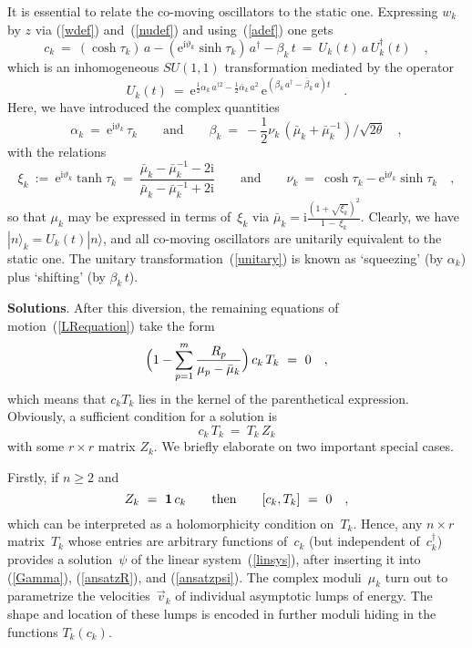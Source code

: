 \documentclass[a4paper,11pt]{article}
\numberwithin{equation}{section}
\def\a{\alpha}
\def\b{\beta}
\def\th{\theta}
\def\e{\mbox{e}}
\def\i{\mbox{i}}
\def\sfrac#1#2{{\textstyle\frac{#1}{#2}}}
\newcommand{\adag}{a^{\dagger}}
\begin{document}
It is essential to relate the co-moving oscillators to the static one.
Expressing $w_k$ by $z$ via (\ref{wdef}) and~(\ref{nudef})
and using~(\ref{adef}) one gets
\begin{equation} \label{unitary}
c_k\ =\ (\cosh\tau_k)\,a - (\e^{\i\vartheta_k}\sinh\tau_k)\,\adag
- \b_k\,t\ =\ U_k(t)\,a\,U_k^\dagger(t) \quad,
\end{equation}
which is an inhomogeneous $SU(1,1)$ transformation mediated by the operator
\cite{perel}
\begin{equation} \label{Udef}
U_k(t)\ =\ \e^{\frac12\a_k\,a^{\dagger 2} -\frac12\bar\a_k\,a^2}\,
\e^{(\b_k\,\adag-\bar\b_k\,a)t} \quad.
\end{equation}
Here, we have introduced the complex quantities
\begin{equation}
\a_k\ =\ \e^{\i\vartheta_k}\,\tau_k
\qquad\textrm{and}\qquad
\b_k\ =\ -\sfrac12\nu_k\,(\bar\mu_k{+}\bar\mu_k^{-1})/\sqrt{2\th} \quad,
\end{equation}
with the relations
\begin{equation}
\xi_k\ :=\ \e^{\i\vartheta_k}\tanh\tau_k\ =\
\frac{\bar\mu_k{-}\bar\mu_k^{-1}{-}2\i}{\bar\mu_k{-}\bar\mu_k^{-1}{+}2\i}
\qquad\textrm{and}\qquad
\nu_k\ =\ \cosh\tau_k-\e^{\i\vartheta_k}\sinh\tau_k \quad,
\end{equation}
so that $\mu_k$ may be expressed in terms of~$\xi_k$ via
$\bar\mu_k=\i\frac{(1+\sqrt{\xi_k})^2}{1\,-\,\xi_k}$.
Clearly, we have $|n\rangle_k=U_k(t)|n\rangle$, and all co-moving
oscillators are unitarily equivalent to the static one.
The unitary transformation~(\ref{unitary}) is known
as `squeezing' (by $\a_k$) plus `shifting' (by $\b_k\,t$).

\noindent
{\bf Solutions}.
After this diversion, the remaining equations of motion~(\ref{LRequation})
take the form
\begin{equation} \label{eom}
\Bigl(1-\sum_{p=1}^m\frac{R_p}{\mu_p-\bar{\mu}_k}\Bigr)\,c_k\,T_k\ =\ 0\quad,
\end{equation}
which means that $c_k T_k$ lies in the kernel of the parenthetical expression.
Obviously, a sufficient condition for a solution is
\begin{equation} \label{holT}
c_k\,T_k\ =\ T_k\,Z_k
\end{equation}
with some $r{\times}r$ matrix $Z_k$.
We briefly elaborate on two important special cases.

Firstly, if $n{\ge}2$ and
\begin{equation}
Z_k\ =\ {\bf1}\,c_k \qquad\textrm{then}\qquad [c_k,T_k]\ =\ 0 \quad,
\end{equation}
which can be interpreted as a holomorphicity condition on~$T_k$.
Hence, any $n{\times}r$ matrix~$T_k$ whose entries are arbitrary functions
of~$c_k$ (but independent of~$c_k^\dag$) provides a solution~$\psi$ of the
linear system~(\ref{linsys}), after inserting it into (\ref{Gamma}),
(\ref{ansatzR}), and (\ref{ansatzpsi}). The complex moduli~$\mu_k$ turn
out to parametrize the velocities~$\vec{v}_k$ of individual asymptotic
lumps of energy. The shape and location of these lumps is encoded
in further moduli hiding in the functions $T_k(c_k)$.
\end{document}
